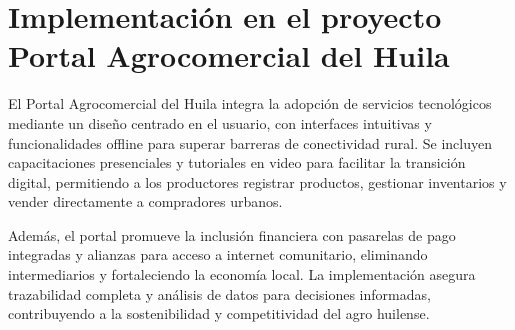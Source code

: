 \section{Implementación en el proyecto Portal Agrocomercial del Huila}

El Portal Agrocomercial del Huila integra la adopción de servicios tecnológicos mediante un diseño centrado en el usuario, con interfaces intuitivas y funcionalidades offline para superar barreras de conectividad rural. Se incluyen capacitaciones presenciales y tutoriales en video para facilitar la transición digital, permitiendo a los productores registrar productos, gestionar inventarios y vender directamente a compradores urbanos.

Además, el portal promueve la inclusión financiera con pasarelas de pago integradas y alianzas para acceso a internet comunitario, eliminando intermediarios y fortaleciendo la economía local. La implementación asegura trazabilidad completa y análisis de datos para decisiones informadas, contribuyendo a la sostenibilidad y competitividad del agro huilense.